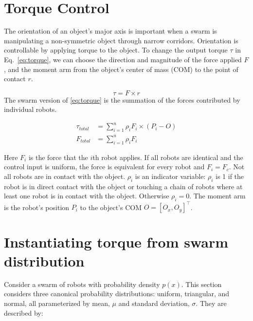 \section{Torque Control}
\label{sec:theory}


The orientation of an object's major axis is important when a swarm is manipulating a non-symmetric object through narrow corridors. 
Orientation is controllable by applying torque to the object. 
To change the output torque $\tau$ in Eq.~\eqref{eq:torque}, we can choose the direction and magnitude of the force applied $F$, and the moment arm from the object's center of mass (COM) to the point of contact $r$.

\begin{equation}
\tau = F \times r\label{eq:torque}
\end{equation}
The swarm version of \eqref{eq:torque} is the summation of the forces contributed by individual robots.

\begin{align}
\tau_{total} &= \sum\limits_{i=1}^n \rho_i F_i \times (P_i - O )   \label{eq:swarmtorque}\\
F_{total} &= \sum\limits_{i=1}^n \rho_i F_i  \label{eq:swarmforce}
\end{align}

Here $F_i$ is the force that the $i$th robot applies.  If all robots are identical and the control input is uniform, the force is equivalent for every robot and $F_i = F_c$.
Not all robots are in contact with the object.  $\rho_i$ is an indicator variable: $\rho_i$ is 1 if the robot is in direct contact with the object or touching a chain of robots where at least one robot is in contact with the object. Otherwise $\rho_i = 0$.
The moment arm is the robot's position $P_i$ to the object's COM $O=[O_x,O_y]^{\top}$.

\section{Instantiating torque from swarm distribution}

Consider a swarm of robots with probability density $p(x)$. This section considers three canonical probability distributions: uniform, triangular, and normal, all parameterized by mean, $\mu$ and standard deviation, $\sigma$. They are described by:

